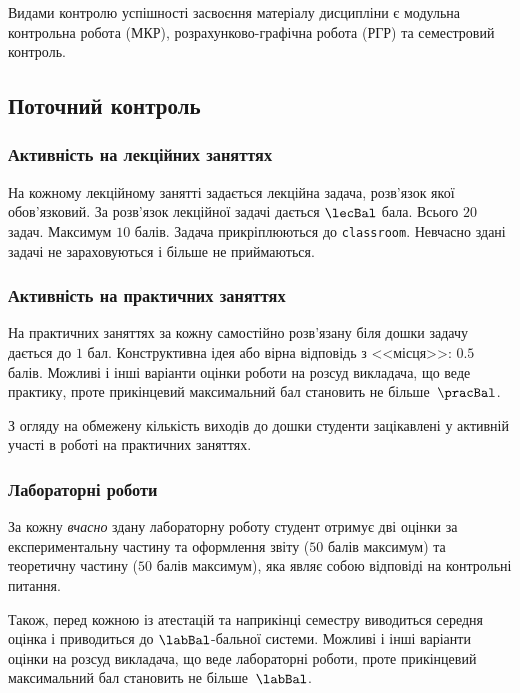 \documentclass{Syllabus}
\begin{document}
Видами контролю успішності засвоєння матеріалу дисципліни є  модульна контрольна робота (МКР), розрахунково-графічна робота (РГР) та семестровий контроль.


\subsection*{Поточний контроль}

\subsubsection*{Активність на лекційних заняттях}
На кожному лекційному занятті задається лекційна задача, роз\-в'язок якої обов'язковий. За роз\-в'язок лекційної задачі дається $\lecBal$ бала. Всього $
20 $ задач. Максимум $ 10 $ балів. Задача прикріплюються до \texttt{classroom}. Невчасно здані задачі не зараховуються і більше не приймаються.

\subsubsection*{Активність на практичних заняттях}

На практичних заняттях за кожну самостійно розв’язану біля дошки задачу дається до $1$ бал. Конструктивна ідея або вірна відповідь з <<місця>>: $0.5$ балів. Можливі і інші варіанти оцінки роботи на розсуд викладача, що веде практику, проте прикінцевий максимальний бал становить не більше~$\pracBal$.

З огляду на обмежену кількість виходів до дошки студенти зацікавлені у активній участі в роботі на практичних заняттях.

\subsubsection*{Лабораторні роботи}

За кожну \emph{вчасно} здану лабораторну роботу студент отримує дві оцінки за експериментальну частину та оформлення звіту ($ 50 $ балів максимум) та теоретичну частину ($ 50 $ балів максимум), яка являє собою відповіді на контрольні питання.

Також, перед кожною із атестацій та наприкінці семестру виводиться середня оцінка  і приводиться до $ \labBal $-бальної системи. Можливі і інші варіанти оцінки на розсуд викладача, що веде лабораторні роботи, проте прикінцевий максимальний бал становить не більше~$\labBal$.
\end{document}
